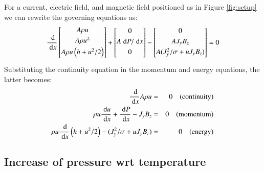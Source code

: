 \documentclass{warpdoc}
\newcommand{\ordi}{\; {\rm d}}
\newcommand{\alb}{\vspace{0.1cm}\\} %
\begin{document}
For a current, electric field, and magnetic field positioned as in Figure
\ref{fig:setup} we can rewrite the governing equations as:
%
\begin{equation}
  \frac{\ordi}{\ordi x}
     \left[
      \begin{array}{@{}c@{}}
        A {\rho} u \alb
        A {\rho} u^2\alb
        A {\rho} u \left(h+u^2/2\right)\alb
      \end{array}
    \right]
  +\left[
      \begin{array}{@{}c@{}}
      0 \alb
      A \ordi P / \ordi x\alb
      0 \alb
      \end{array}
   \right]
  -\left[
      \begin{array}{@{}c@{}}
      0 \alb
      A J_y B_z\alb
      A (J_y^2/\sigma + u J_y B_z)\alb
      \end{array}
   \right]=0
\end{equation}
%
Substituting the continuity equation in the momentum and energy equations, the latter
becomes:
%
\begin{eqnarray}
\frac{\ordi}{\ordi x} A \rho u &=& 0 {\rm ~~~~(continuity)}\label{eqn:continuity}\alb
  \rho u \frac{\ordi u}{\ordi x} +  \frac{\ordi P}{\ordi x} -  J_y B_z &=&0 {\rm ~~~~(momentum)}\label{eqn:momentum}\alb
  \rho u \frac{\ordi}{\ordi x} \left( h+u^2/2 \right) - (J_y^2/\sigma + u J_y B_z)&=&0 {\rm ~~~~(energy)}\label{eqn:energy}
\end{eqnarray}
%



\subsection{Increase of pressure wrt temperature}
\end{document}
